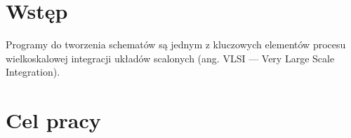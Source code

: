 \section{Wstęp}

Programy do tworzenia schematów są jednym z kluczowych elementów
procesu wielkoskalowej integracji układów scalonych (ang. VLSI — Very Large Scale Integration)\cite{VLSI}.


\section{Cel pracy}